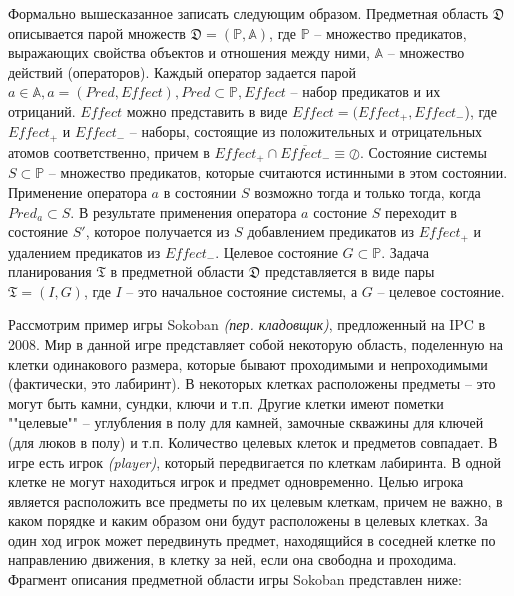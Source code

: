 Формально вышесказанное записать следующим образом. Предметная область $\mathfrak{D}$ описывается парой множеств $\mathfrak{D}=(\mathbb{P},\mathbb{A})$, где $\mathbb{P}$ -- множество предикатов, выражающих свойства объектов и отношения между ними, $\mathbb{A}$   -- множество действий (операторов). Каждый оператор задается парой $a \in \mathbb{A}, a = (Pred, Effect), Pred \subset \mathbb{P}, Effect$ -- набор предикатов и их отрицаний. $Effect$ можно представить в виде $Effect = (Effect_+, Effect_-$), где $Effect_+$ и $Effect_-$ -- наборы, состоящие из положительных и отрицательных атомов соответственно, причем в $Effect_+ \cap \overline{Effect_-} \equiv \oslash$. Состояние системы $S \subset \mathbb{P}$ -- множество предикатов, которые считаются истинными в этом состоянии. Применение оператора $a$ в состоянии $S$ возможно тогда и только тогда, когда $Pred_a \subset S$. В результате применения оператора $a$ состоние $S$ переходит в состояние $S'$, которое получается из $S$ добавлением предикатов из $Effect_+$ и удалением предикатов из $Effect_-$. Целевое состояние $G \subset \mathbb{P}$. Задача планирования $\mathfrak{T}$ в предметной области $\mathfrak{D}$ представляется в виде пары $\mathfrak{T} = (I, G)$, где $I$ -- это начальное состояние системы, а $G$ -- целевое состояние.

Рассмотрим пример игры Sokoban \textit{(пер. кладовщик)}, предложенный на IPC в 2008. Мир в данной игре представляет собой некоторую область, поделенную на клетки одинакового размера, которые бывают проходимыми и непроходимыми (фактически, это лабиринт). В некоторых клетках расположены предметы -- это могут быть камни, сундки, ключи и т.п. Другие клетки имеют пометки ""целевые"" -- углубления в полу для камней, замочные скважины для ключей (для люков в полу) и т.п. Количество целевых клеток и предметов совпадает. В игре есть игрок \textit{(player)}, который передвигается по клеткам лабиринта. В одной клетке не могут находиться игрок и предмет одновременно. Целью игрока является расположить все предметы по их целевым клеткам, причем не важно, в каком порядке и каким образом они будут расположены в целевых клетках. За один ход игрок может передвинуть предмет, находящийся в соседней клетке по направлению движения, в клетку за ней, если она свободна и проходима. Фрагмент описания предметной области игры Sokoban представлен ниже: 

